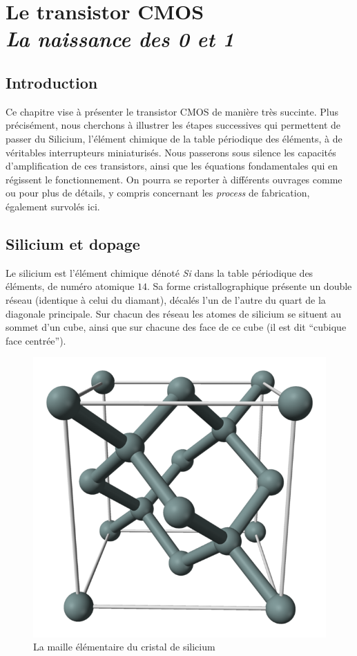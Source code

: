 \chapter[Le transistor]{Le transistor CMOS\\{\it La naissance des 0 et 1}}

\minitoc

\section{Introduction}
Ce chapitre vise à présenter le transistor CMOS de manière très succinte. Plus précisément, nous cherchons à illustrer les étapes successives qui permettent
de passer du Silicium,  l'élément chimique de la table périodique des éléments, à de véritables interrupteurs miniaturisés. Nous passerons sous silence
les capacités d'amplification de ces transistors, ainsi que les équations fondamentales qui en régissent le fonctionnement. On pourra se reporter à différents
ouvrages comme \cite{Weste2010} ou \cite{Ngo2012} pour plus de détails, y compris concernant les {\it process} de fabrication, également survolés ici.

\section{Silicium et dopage}
Le silicium  est l'élément chimique dénoté {\it Si} dans la table périodique des éléments, de numéro atomique $14$.
Sa forme cristallographique présente un double réseau (identique à celui du diamant), décalés l'un de l'autre du quart de la diagonale principale. Sur chacun des réseau les atomes de silicium se situent au sommet d'un cube, ainsi que sur chacune des face de ce cube (il est dit ``cubique face centrée'').

\begin{figure}[htb]
\begin{center}
\includegraphics[scale=0.15]{figures/double_fc.png}
\caption{La maille élémentaire du cristal de silicium}
\end{center}
\end{figure}

